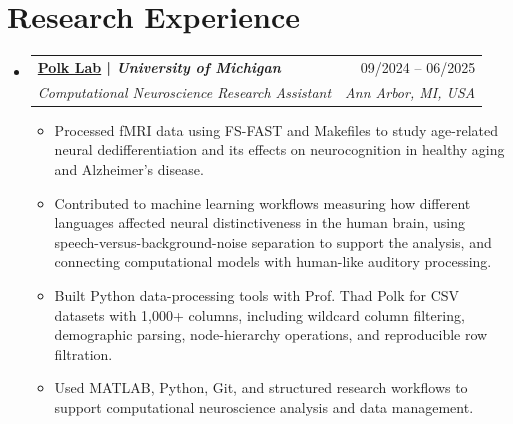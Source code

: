 \documentclass[letterpaper,11pt]{article}
\makeatletter
\newcommand{\resumeItem}[1]{
  \item\small{
    {#1 \vspace{-2pt}}
  }
}
\newcommand{\resumeSubheading}[4]{
  \vspace{-2pt}\item
    \begin{tabular*}{0.97\textwidth}[t]{l@{\extracolsep{\fill}}r}
      \textbf{#1} & #2 \\
      \textit{\small#3} & \textit{\small #4} \\
    \end{tabular*}\vspace{-7pt}
}
\newcommand{\resumeSubHeadingListStart}{\begin{itemize}[leftmargin=0.15in, label={}]}
\newcommand{\resumeSubHeadingListEnd}{\end{itemize}}
\newcommand{\resumeItemListStart}{\begin{itemize}}
\newcommand{\resumeItemListEnd}{\end{itemize}\vspace{-5pt}}
\makeatother
\begin{document}
\section{Research Experience}
    \resumeSubHeadingListStart
        \resumeSubheading
            {\href{https://sites.lsa.umich.edu/polklab/}{Polk Lab} | \textit{University of Michigan}}{09/2024 -- 06/2025}
            {Computational Neuroscience Research Assistant}{Ann Arbor, MI, USA}
            \resumeItemListStart
                \resumeItem{Processed fMRI data using FS-FAST and Makefiles to study age-related neural dedifferentiation and its effects on neurocognition in healthy aging and Alzheimer's disease.}
                \resumeItem{Contributed to machine learning workflows measuring how different languages affected neural distinctiveness in the human brain, using speech-versus-background-noise separation to support the analysis, and connecting computational models with human-like auditory processing.}
                \resumeItem{Built Python data-processing tools with Prof. Thad Polk for CSV datasets with 1,000+ columns, including wildcard column filtering, demographic parsing, node-hierarchy operations, and reproducible row filtration.}
                \resumeItem{Used MATLAB, Python, Git, and structured research workflows to support computational neuroscience analysis and data management.}
            \resumeItemListEnd
    \resumeSubHeadingListEnd

\end{document}
